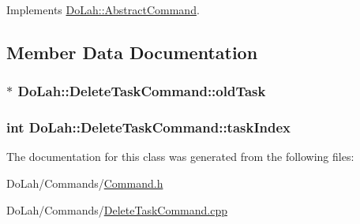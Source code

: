 Implements \hyperlink{class_do_lah_1_1_abstract_command_a9760328f2d6b85d8edc803a97a29dfc0}{Do\+Lah\+::\+Abstract\+Command}.



\subsection{Member Data Documentation}
\hypertarget{class_do_lah_1_1_delete_task_command_aa70d6d5fff7973d863eee62f8083ecf8}{}
\subsubsection[{old\+Task}]{$\ast$ Do\+Lah\+::\+Delete\+Task\+Command\+::old\+Task\hspace{0.3cm}{\ttfamily [private]}}\label{class_do_lah_1_1_delete_task_command_aa70d6d5fff7973d863eee62f8083ecf8}
\hypertarget{class_do_lah_1_1_delete_task_command_af9cbd93b6c67186873af50cbaeb2b4bf}{}
\subsubsection[{task\+Index}]{\setlength{\rightskip}{0pt plus 5cm}int Do\+Lah\+::\+Delete\+Task\+Command\+::task\+Index\hspace{0.3cm}{\ttfamily [private]}}\label{class_do_lah_1_1_delete_task_command_af9cbd93b6c67186873af50cbaeb2b4bf}


The documentation for this class was generated from the following files\+:\begin{DoxyCompactItemize}
\item 
Do\+Lah/\+Commands/\hyperlink{_command_8h}{Command.\+h}\item 
Do\+Lah/\+Commands/\hyperlink{_delete_task_command_8cpp}{Delete\+Task\+Command.\+cpp}\end{DoxyCompactItemize}
